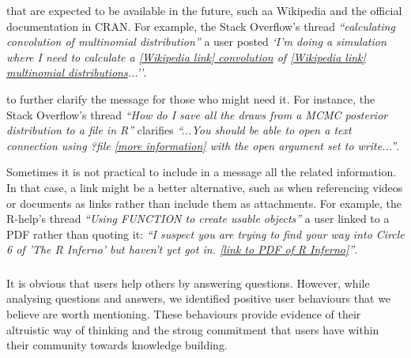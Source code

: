     \begin{description}[itemsep=3pt, topsep=2pt, leftmargin=1em, parsep=0pt]
        \item[Use well maintained websites] that are expected to be available in the future, such aa Wikipedia and the official documentation in CRAN.
        For example, the Stack Overflow's thread \textit{``calculating convolution of multinomial distribution''} a user posted \textit{`I'm doing a simulation
          where I need to calculate a \href{https://en.wikipedia.org/wiki/Convolution_of_probability_distributions}{[Wikipedia link] convolution} of
          \href{https://en.wikipedia.org/wiki/Multinomial_distribution}{[Wikipedia link] multinomial distributions}...''}.

        \item[Use resources that support or expand the message] to further clarify the message for those who might need it.
        For instance, the Stack Overflow's thread \textit{``How do I save all the draws from a MCMC posterior distribution to a file in R''} clarifies \textit{``...You should be able to open a text connection using ?file \href{http://stat.ethz.ch/R-manual/R-devel/library/base/html/connections.html}{[more information]} with the open argument set to write...''}.

        \item[When material relevant to the message is too big.] Sometimes it is not practical to include in a message all the related information. In that
          case, a link might be a better alternative, such as when referencing videos or documents as links rather than include them as attachments.
        For example, the R-help's thread \textit{``Using FUNCTION to create usable objects''} a user linked to a PDF rather than quoting it: \textit{``I suspect you are trying to find your way
          into Circle 6 of 'The R Inferno' but haven't yet got in. \href{http://www.burns-stat.com/pages/Tutor/R\_inferno.pdf}{[link to PDF of R Inferno]}''}.
    \end{description}

\subsubsection{\rece}
\label{sec:userbeh}

It is obvious that users help others by answering questions. However, while analysing questions and answers, we identified positive user behaviours that
we believe are worth mentioning.  These behaviours provide evidence of their altruistic way of thinking and the strong commitment that users have within their
community towards knowledge building.

